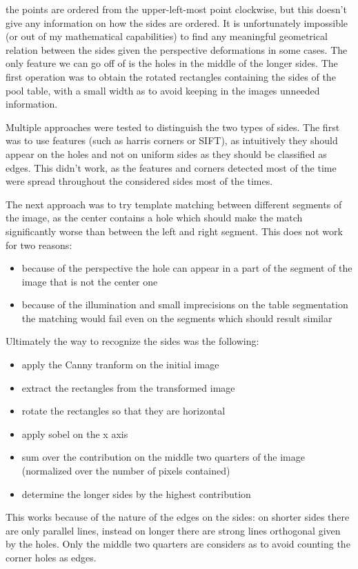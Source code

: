 the points are ordered from the upper-left-most point clockwise, but this doesn't give
any information on how the sides are ordered. It is unfortunately impossible (or out of my
mathematical capabilities) to find any meaningful geometrical relation between the sides
given the perspective deformations in some cases. The only feature we can go off of is the 
holes in the middle of the longer sides. The first operation was to obtain the rotated
rectangles containing the sides of the pool table, with a small width as to avoid 
keeping in the images unneeded information.\par 
Multiple approaches were tested to distinguish the two types of sides. The first was 
to use features (such as harris corners or SIFT), as intuitively they should appear 
on the holes and not on uniform sides as they should be classified as edges. This didn't
work, as the features and corners detected most of the time were spread throughout the 
considered sides most of the times.\par
The next approach was to try template matching between different segments of the image,
as the center contains a hole which should make the match significantly worse than
between the left and right segment. This does not work for two reasons:
\begin{itemize}
    \item because of the perspective the hole can appear in a part of the segment of the image that is not the center one
    \item because of the illumination and small imprecisions on the table segmentation the matching would fail even on the segments which should result similar
\end{itemize}
\par
Ultimately the way to recognize the sides was the following:
\begin{itemize}
    \item apply the Canny tranform on the initial image
    \item extract the rectangles from the transformed image
    \item rotate the rectangles so that they are horizontal
    \item apply sobel on the x axis
    \item sum over the contribution on the middle two quarters of the image (normalized over the number of pixels contained)
    \item determine the longer sides by the highest contribution
\end{itemize}
This works because of the nature of the edges on the sides: on shorter sides there
are only parallel lines, instead on longer there are strong lines orthogonal given by the holes.
Only the middle two quarters are considers as to avoid counting the corner holes as edges.

